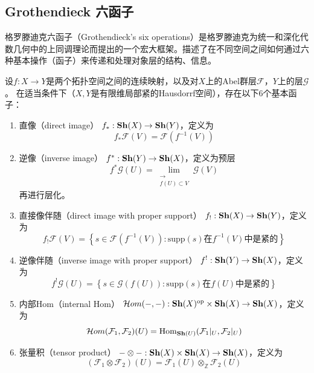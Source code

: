 \documentclass[12pt,a4paper]{ctexrep}   %
\begin{document}
\subsection{Grothendieck 六函子}
格罗滕迪克六函子（Grothendieck's six operations）是格罗滕迪克为统一和深化代数几何中的上同调理论而提出的一个宏大框架。描述了在不同空间之间如何通过六种基本操作（函子）来传递和处理对象层的结构、信息。

\begin{definition}
    设$f:X\to Y$是两个拓扑空间之间的连续映射，以及对$X$上的Abel群层$\mathcal{F}$，$Y$上的层$\mathcal{G}$。
    在适当条件下（$X,Y$是有限维局部紧的Hausdorrf空间），存在以下6个基本函子：
    \begin{enumerate}
        \item 直像（direct image） $f_*:\mathbf{Sh}(X)\to \mathbf{Sh}(Y) $，定义为
              \begin{equation*}
                  f_*\mathcal{F}(V)=\mathcal{F}(f^{-1}(V))
              \end{equation*}
        \item 逆像（inverse image） $f^{*}:\mathbf{Sh}(Y)\to \mathbf{Sh}(X)$，定义为预层
              \begin{equation*}
                  f^{*}\mathcal{G}(U)=\lim_{\substack{\longrightarrow\\f(U)\subset V}} \mathcal{G}(V)
              \end{equation*}
              再进行层化。
        \item 直接像伴随（direct image with proper support） $f_!:\mathbf{Sh}(X)\to \mathbf{Sh}(Y)$，定义为
              \begin{equation*}
                  f_!\mathcal{F}(V)=\left\{s\in \mathcal{F}(f^{-1}(V)):\text{supp}(s)\text{在}f^{-1}(V)\text{中是紧的}\right\}
              \end{equation*}
        \item 逆像伴随（inverse image with proper support） $f^!:\mathbf{Sh}(Y)\to \mathbf{Sh}(X)$，定义为
              \begin{equation*}
                  f^!\mathcal{G}(U)=\left\{s\in \mathcal{G}(f(U)):\text{supp}(s)\text{在}f(U)\text{中是紧的}\right\}
              \end{equation*}
        \item 内部Hom（internal Hom） $\mathcal{H}om(-,-):\mathbf{Sh}
                  (X)^{\mathrm{op}}\times \mathbf{Sh}(X)\to \mathbf{Sh}(X)$，定义为
              \begin{equation*}
                  \mathcal{H}om(\mathcal{F}_1,\mathcal{F}_2)(U)=\operatorname{Hom}_{\mathbf{Sh}(U)}(\mathcal{F}_1|_U,\mathcal{F}_2|_U)
              \end{equation*}
        \item 张量积（tensor product） $-\otimes-:\mathbf{Sh}(X)\times \mathbf{Sh}(X)\to \mathbf{Sh}(X)$，定义为
              \begin{equation*}
                  (\mathcal{F}_1\otimes \mathcal{F}_2)(U)=\mathcal{F}_1(U)\otimes_{\mathbb{Z}}\mathcal{F}_2(U)
              \end{equation*}
    \end{enumerate}
\end{definition}
\end{document}
